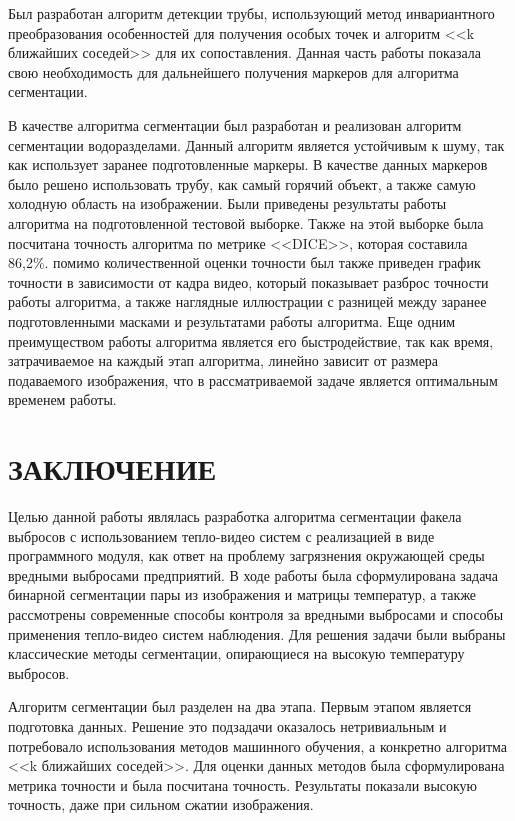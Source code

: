 \documentclass[14pt, a4paper]{extreport}
\begin{document}
	Был разработан алгоритм детекции трубы, использующий метод инвариантного преобразования особенностей для получения особых точек и алгоритм <<k ближайших соседей>> для их сопоставления. Данная часть работы показала свою необходимость для дальнейшего получения маркеров для алгоритма сегментации.
	
	В качестве алгоритма сегментации был разработан и реализован алгоритм сегментации водоразделами. Данный алгоритм является устойчивым к шуму, так как использует заранее подготовленные маркеры. В качестве данных маркеров было решено использовать трубу, как самый горячий объект, а также самую холодную область на изображении. Были приведены результаты работы алгоритма на подготовленной тестовой выборке. Также на этой выборке была посчитана точность алгоритма по метрике <<DICE>>, которая составила 86,2\%. помимо количественной оценки точности был также приведен график точности в зависимости от кадра видео, который показывает разброс точности работы алгоритма, а также наглядные иллюстрации с разницей между заранее подготовленными масками и результатами работы алгоритма. Еще одним преимуществом работы алгоритма является его быстродействие, так как время, затрачиваемое на каждый этап алгоритма, линейно зависит от размера подаваемого изображения, что в рассматриваемой задаче является оптимальным временем работы.

\chapter*{ЗАКЛЮЧЕНИЕ}
	Целью данной работы являлась разработка алгоритма сегментации факела выбросов с использованием тепло-видео систем с реализацией в виде программного модуля, как ответ на проблему загрязнения окружающей среды вредными выбросами предприятий. В ходе работы была сформулирована задача бинарной сегментации пары из изображения и матрицы температур, а также рассмотрены современные способы контроля за вредными выбросами и способы применения тепло-видео систем наблюдения. Для решения задачи были выбраны классические методы сегментации, опирающиеся на высокую температуру выбросов.
	
	Алгоритм сегментации был разделен на два этапа. Первым этапом является подготовка данных. Решение это подзадачи оказалось нетривиальным и потребовало использования методов машинного обучения, а конкретно алгоритма <<k ближайших соседей>>. Для оценки данных методов была сформулирована метрика точности и была посчитана точность. Результаты показали высокую точность, даже при сильном сжатии изображения.
	
\end{document}
